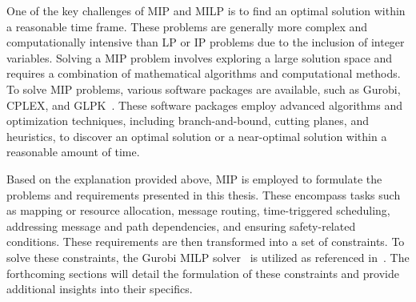     One of the key challenges of MIP and MILP is to find an optimal solution within a reasonable time frame. These problems are generally more complex and computationally intensive than LP or IP problems due to the inclusion of integer variables. Solving a MIP problem involves exploring a large solution space and requires a combination of mathematical algorithms and computational methods.
    To solve MIP problems, various software packages are available, such as Gurobi, CPLEX, and GLPK~\cite{gurobi, cplex2009v12, gnu}. These software packages employ advanced algorithms and optimization techniques, including branch-and-bound, cutting planes, and heuristics, to discover an optimal solution or a near-optimal solution within a reasonable amount of time.
    
    
    
    
    Based on the explanation provided above, MIP is employed to formulate the problems and requirements presented in this thesis. These encompass tasks such as mapping or resource allocation, message routing, time-triggered scheduling, addressing message and path dependencies, and ensuring safety-related conditions. These requirements are then transformed into a set of constraints. To solve these constraints, the Gurobi MILP solver~\cite{gurobi} is utilized as referenced in~\cite{9565115, askaripoor2023designer}. The forthcoming sections will detail the formulation of these constraints and provide additional insights into their specifics.

